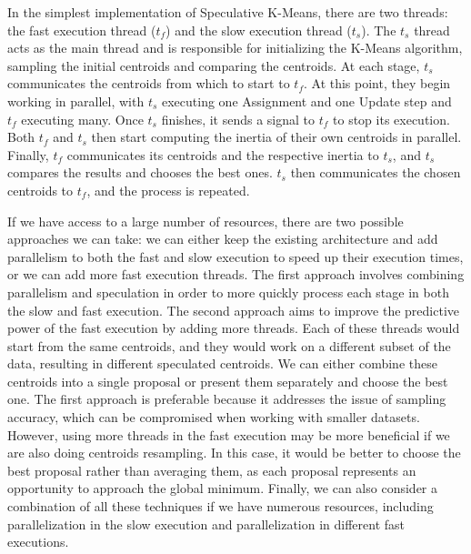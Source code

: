 In the simplest implementation of Speculative K-Means, there are two threads: the fast execution thread ($t_f$) and the slow execution thread ($t_s$). The $t_s$ thread acts as the main thread and is responsible for initializing the K-Means algorithm, sampling the initial centroids and comparing the centroids.
At each stage, $t_s$ communicates the centroids from which to start to $t_f$. At this point, they begin working in parallel, with $t_s$ executing one Assignment and one Update step and $t_f$ executing many. Once $t_s$ finishes, it sends a signal to $t_f$ to stop its execution. Both $t_f$ and $t_s$ then start computing the inertia of their own centroids in parallel. Finally, $t_f$ communicates its centroids and the respective inertia to $t_s$, and $t_s$ compares the results and chooses the best ones. $t_s$ then communicates the chosen centroids to $t_f$, and the process is repeated.

If we have access to a large number of resources, there are two possible approaches we can take: we can either keep the existing architecture and add parallelism to both the fast and slow execution to speed up their execution times, or we can add more fast execution threads. The first approach involves combining parallelism and speculation in order to more quickly process each stage in both the slow and fast execution. The second approach aims to improve the predictive power of the fast execution by adding more threads. Each of these threads would start from the same centroids, and they would work on a different subset of the data, resulting in different speculated centroids. We can either combine these centroids into a single proposal or present them separately and choose the best one. The first approach is preferable because it addresses the issue of sampling accuracy, which can be compromised when working with smaller datasets. However, using more threads in the fast execution may be more beneficial if we are also doing centroids resampling. In this case, it would be better to choose the best proposal rather than averaging them, as each proposal represents an opportunity to approach the global minimum. Finally, we can also consider a combination of all these techniques if we have numerous resources, including parallelization in the slow execution and parallelization in different fast executions.